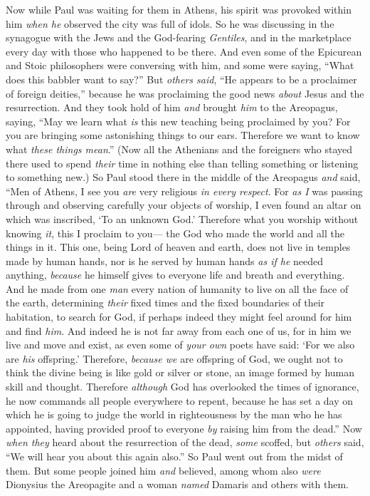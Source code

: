 \begin{biblechapter}
 Now while Paul was waiting for them in Athens, his spirit was provoked within him \textit{when he} observed the city was full of idols.
\verse So he was discussing in the synagogue with the Jews and the God-fearing \textit{Gentiles}, and in the marketplace every day with those who happened to be there.
\verse And even some of the Epicurean and Stoic philosophers were conversing with him, and some were saying, “What does this babbler want to say?” But \textit{others said}, “He appears to be a proclaimer of foreign deities,” because he was proclaiming the good news \textit{about} Jesus and the resurrection.
\verse And they took hold of him \textit{and} brought \textit{him} to the Areopagus, saying, “May we learn what \textit{is} this new teaching being proclaimed by you?
\verse For you are bringing some astonishing things to our ears. Therefore we want to know what \textit{these things mean}.”
\verse (Now all the Athenians and the foreigners who stayed there used to spend \textit{their} time in nothing else than telling something or listening to something new.)
 So Paul stood there in the middle of the Areopagus \textit{and} said, “Men of Athens, I see you \textit{are} very religious \textit{in every respect}.
\verse For \textit{as I} was passing through and observing carefully your objects of worship, I even found an altar on which was inscribed, ‘To an unknown God.’ Therefore what you worship without knowing \textit{it}, this I proclaim to you—
\verse the God who made the world and all the things in it. This one, being Lord of heaven and earth, does not live in temples made by human hands,
\verse nor is he served by human hands \textit{as if he} needed anything, \textit{because} he himself gives to everyone life and breath and everything.
\verse And he made from one \textit{man} every nation of humanity to live on all the face of the earth, determining \textit{their} fixed times and the fixed boundaries of their habitation,
\verse to search for God, if perhaps indeed they might feel around for him and find \textit{him}. And indeed he is not far away from each one of us,
\verse for in him we live and move and exist, as even some of \textit{your own} poets have said: ‘For we also are \textit{his} offspring.’
\verse Therefore, \textit{because we} are offspring of God, we ought not to think the divine being is like gold or silver or stone, an image formed by human skill and thought.
\verse Therefore \textit{although} God has overlooked the times of ignorance, he now commands all people everywhere to repent,
\verse because he has set a day on which he is going to judge the world in righteousness by the man who he has appointed, having provided proof to everyone \textit{by} raising him from the dead.”
\verse Now \textit{when they} heard about the resurrection of the dead, \textit{some} scoffed, but \textit{others} said, “We will hear you about this again also.”
\verse So Paul went out from the midst of them.
\verse But some people joined him \textit{and} believed, among whom also \textit{were} Dionysius the Areopagite and a woman \textit{named} Damaris and others with them.
\end{biblechapter}

